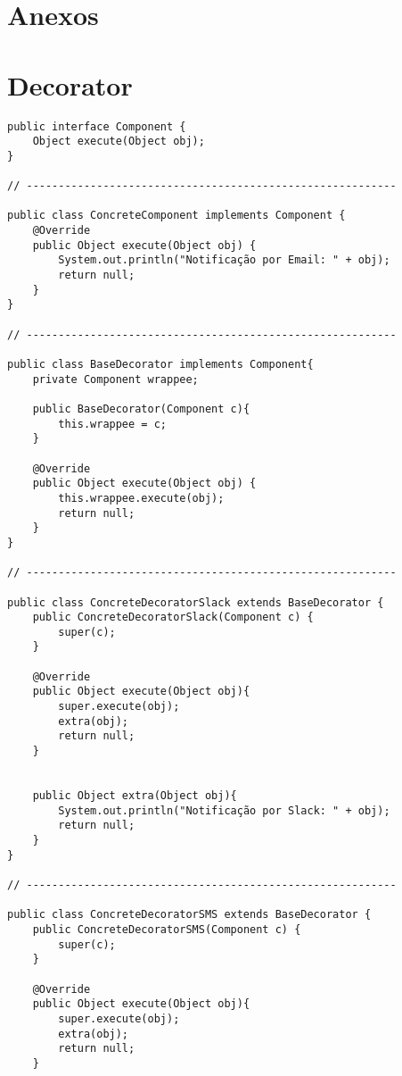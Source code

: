 \section{Anexos}
\label{sec:anexos}

\appendix

\section{Decorator}
\label{anexo:decorator}

\begin{verbatim}
public interface Component {
    Object execute(Object obj);
}

// ----------------------------------------------------------

public class ConcreteComponent implements Component {
    @Override
    public Object execute(Object obj) {
        System.out.println("Notificação por Email: " + obj);
        return null;
    }
}

// ----------------------------------------------------------

public class BaseDecorator implements Component{
    private Component wrappee;

    public BaseDecorator(Component c){
        this.wrappee = c;
    }

    @Override
    public Object execute(Object obj) {
        this.wrappee.execute(obj);
        return null;
    }
}

// ----------------------------------------------------------

public class ConcreteDecoratorSlack extends BaseDecorator {
    public ConcreteDecoratorSlack(Component c) {
        super(c);
    }

    @Override
    public Object execute(Object obj){
        super.execute(obj);
        extra(obj);
        return null;
    }


    public Object extra(Object obj){
        System.out.println("Notificação por Slack: " + obj);
        return null;
    }
}

// ----------------------------------------------------------

public class ConcreteDecoratorSMS extends BaseDecorator {
    public ConcreteDecoratorSMS(Component c) {
        super(c);
    }

    @Override
    public Object execute(Object obj){
        super.execute(obj);
        extra(obj);
        return null;
    }


\end{verbatim}
